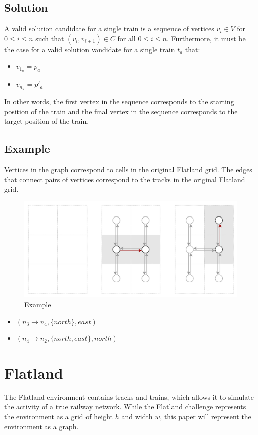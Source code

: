 \subsection{Solution}\label{sec:solution}
A valid solution candidate for a single train is a sequence of vertices $v_i \in V$ for $0 \leq i \leq n$ such that $(v_i,v_{i+1}) \in C$ for all $0 \leq i \leq n$.  Furthermore, it must be the case for a valid solution vandidate for a single train $t_a$ that:
\begin{itemize}
	\item $v_{1_a} = p_a$
	\item $v_{n_a} = p'_a$
\end{itemize}
\noindent In other words, the first vertex in the sequence corresponds to the starting position of the train and the final vertex in the sequence corresponds to the target position of the train.

\subsection{Example}\label{sec:example}
Vertices in the graph correspond to cells in the original Flatland grid.  The edges that connect pairs of vertices correspond to the tracks in the original Flatland grid.  

\begin{figure}
\centering
        \includegraphics[width=\linewidth]{img/edges.png}
    \caption{Example}
    \label{fig:verticalcell}
\end{figure}

\begin{itemize}
	\item $(n_3 \rightarrow n_4, \{north\}, east)$
	\item $(n_4 \rightarrow n_2, \{north, east\}, north)$
\end{itemize}

\pagebreak

\section{Flatland}\label{sec:flatland}
The Flatland environment contains tracks and trains, which allows it to simulate the activity of a true railway network.  While the Flatland challenge represents the environment as a grid of height $h$ and width $w$, this paper will represent the environment as a graph.

